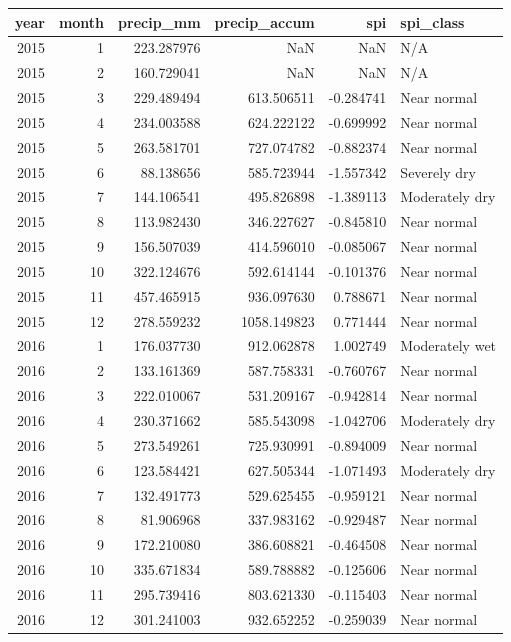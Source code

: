 \begin{tabular}{rrrrrl}
\toprule
year & month & precip\_mm & precip\_accum & spi & spi\_class \\
\midrule
2015 & 1 & 223.287976 & NaN & NaN & N/A \\
2015 & 2 & 160.729041 & NaN & NaN & N/A \\
2015 & 3 & 229.489494 & 613.506511 & -0.284741 & Near normal \\
2015 & 4 & 234.003588 & 624.222122 & -0.699992 & Near normal \\
2015 & 5 & 263.581701 & 727.074782 & -0.882374 & Near normal \\
2015 & 6 & 88.138656 & 585.723944 & -1.557342 & Severely dry \\
2015 & 7 & 144.106541 & 495.826898 & -1.389113 & Moderately dry \\
2015 & 8 & 113.982430 & 346.227627 & -0.845810 & Near normal \\
2015 & 9 & 156.507039 & 414.596010 & -0.085067 & Near normal \\
2015 & 10 & 322.124676 & 592.614144 & -0.101376 & Near normal \\
2015 & 11 & 457.465915 & 936.097630 & 0.788671 & Near normal \\
2015 & 12 & 278.559232 & 1058.149823 & 0.771444 & Near normal \\
2016 & 1 & 176.037730 & 912.062878 & 1.002749 & Moderately wet \\
2016 & 2 & 133.161369 & 587.758331 & -0.760767 & Near normal \\
2016 & 3 & 222.010067 & 531.209167 & -0.942814 & Near normal \\
2016 & 4 & 230.371662 & 585.543098 & -1.042706 & Moderately dry \\
2016 & 5 & 273.549261 & 725.930991 & -0.894009 & Near normal \\
2016 & 6 & 123.584421 & 627.505344 & -1.071493 & Moderately dry \\
2016 & 7 & 132.491773 & 529.625455 & -0.959121 & Near normal \\
2016 & 8 & 81.906968 & 337.983162 & -0.929487 & Near normal \\
2016 & 9 & 172.210080 & 386.608821 & -0.464508 & Near normal \\
2016 & 10 & 335.671834 & 589.788882 & -0.125606 & Near normal \\
2016 & 11 & 295.739416 & 803.621330 & -0.115403 & Near normal \\
2016 & 12 & 301.241003 & 932.652252 & -0.259039 & Near normal \\

\end{tabular}

